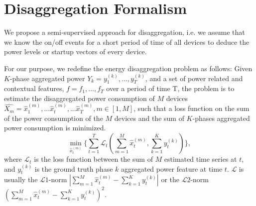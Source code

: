 \section{Disaggregation Formalism}
We propose a semi-supervised approach for disaggregation, i.e.
we assume that we know the on/off events for a short period of time of all devices %
to deduce the power levels %
or startup vectors of every device.


For our purpose, we redefine the energy disaggregation problem as follows:
Given $K$-phase aggregated power 
$Y_k=y_1^{(k)}, ..., y_T^{(k)}$, and a set of
power related and contextual features, $f=f_1, ..., f_T$ over a period of time T, 
the problem is to estimate the disaggregated power consumption of $M$ devices 
$\hat{X_m }= \hat{x}_{1}^{(m)}, ...\hat{x}_{t}^{(m)}, ... \hat{x}_{T}^{(m)}, m\in[1, M]$, 
such that a loss function on the sum of the power consumption of the $M$
devices and the sum of $K$-phases aggregated power consumption is minimized. 
\begin{equation}
\label{eq_powerObj}
\min_{\hat{x}_{t}^{(m)}} \{ \sum_{t=1}^T \mathscr{L}_t(\sum_{m=1}^M \hat{x}_{t}^{(m)}, \sum_{k=1}^Ky_t^{(k)}) \},
\end{equation}
where $\mathscr{L}_t$ is the loss function between 
the sum of $M$ estimated time series at $t$, 
and $y_t^{(k)}$ is the ground truth phase $k$ aggregated power feature at time $t$. 
$\mathscr{L}$ is usually the $\mathscr{L}1$-norm $|\sum_{m=1}^M \hat{x}_{t}^{(m)} -\sum_{k=1}^K y_t^{(k)}|$
or the $\mathscr{L}2$-norm $(\sum_{m=1}^M \hat{x}_{t}^{(m)}-\sum_{k=1}^Ky_t^{(k)})^2$.


